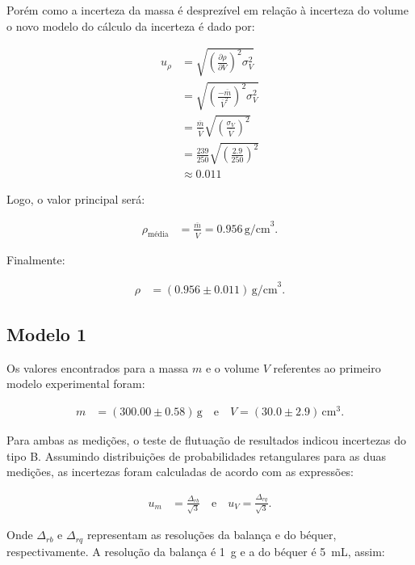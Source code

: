 \documentclass{article}
\begin{document}
\begin{multicols}{2}
Porém como a incerteza da massa é desprezível em relação à incerteza do volume o novo modelo do cálculo da incerteza é dado por:

\begin{align}
u_{\rho} &= \sqrt{\left(\frac{\partial \rho}{\partial V}\right)^2 \sigma^2_V} \\
&= \sqrt{\left(\frac{-\overline{m}}{\overline{V}^2}\right)^2 \sigma^2_V} \nonumber \\
&= \frac{\overline{m}}{\overline{V}} \sqrt{\left(\frac{\sigma_V}{\overline{V}}\right)^2} \nonumber \\
&= \frac{239}{250} \sqrt{\left(\frac{2.9}{250}\right)^2} \nonumber \\
&\approx 0.011 \nonumber
\end{align}

Logo, o valor principal será:

\begin{align}
\rho_{\text{média}} &= \frac{\overline{m}}{\overline{V}} = 0.956 \, \text{g/cm}^3.
\end{align}

Finalmente:

\begin{align}
\rho &= (0.956 \pm 0.011) \, \text{g/cm}^3.
\end{align}

\subsection{Modelo 1}
Os valores encontrados para a massa $m$ e o volume $V$ referentes ao primeiro modelo experimental foram:

\begin{align}
m &= (300.00 \pm 0.58) \, \text{g} \quad \text{e} \quad V = (30.0 \pm 2.9) \, \text{cm}^3.
\end{align}

Para ambas as medições, o teste de flutuação de resultados indicou incertezas do tipo B. Assumindo distribuições de probabilidades retangulares para as duas medições, as incertezas foram calculadas de acordo com as expressões:

\begin{align}
u_m &= \frac{\Delta_{rb}}{\sqrt{3}} \quad \text{e} \quad u_V = \frac{\Delta_{rq}}{\sqrt{3}}.
\end{align}

Onde $\Delta_{rb}$ e $\Delta_{rq}$ representam as resoluções da balança e do béquer, respectivamente. A resolução da balança é \SI{1}{\gram} e a do béquer é \SI{5}{\milli\liter}, assim:


\end{multicols}
\end{document}
